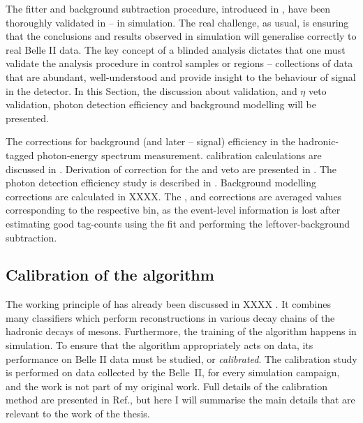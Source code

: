 The fitter and background subtraction procedure, introduced in ,
have been thoroughly validated in  -- in simulation.
The real challenge, as usual, is ensuring that the conclusions and results observed in simulation will generalise correctly to real Belle II data.
The key concept of a blinded analysis dictates that one must validate the analysis procedure in control samples or regions -- collections of data that are abundant, well-understood and provide insight to the behaviour of signal in the detector.
In this Section, the discussion about \FEI validation, \piz and $\eta$ veto validation, photon detection efficiency and background modelling will be presented.

\begin{table}[htbp!]
    \centering
    \caption{\label{tab:correction_table} The corrections for background (and later -- signal) efficiency in the hadronic-tagged \BtoXsgamma photon-energy spectrum measurement.
    \FEI calibration calculations are discussed in .
    Derivation of correction for the \piz and \eta veto are presented in .
    The photon detection efficiency study is described in .
    Background modelling corrections are calculated in XXXX.
    The \FEI, \piz and \gamma corrections are averaged values corresponding to the respective \EB bin,
    as the event-level information is lost after estimating good tag-\B counts using the \Mbc fit and performing the leftover-\BB background subtraction.
    }
    
\end{table}


\subsection{Calibration of the \texorpdfstring{\FEI}{FEI} algorithm}\label{sec:fei_calibration}

The working principle of \FEI has already been discussed in XXXX
.
It combines many classifiers which perform reconstructions in various decay chains of the hadronic decays of \B mesons.
Furthermore, the training of the algorithm happens in simulation.
To ensure that the algorithm appropriately acts on data, its performance on Belle II data must be studied, or \textit{calibrated}.
The calibration study is performed on data collected by the Belle~II, for every simulation campaign, and the work is not part of my original work.
Full details of the calibration method are presented in Ref.\cite{Belle-II:2020fst}, but here I will summarise the main details that are relevant to the work of the thesis.

